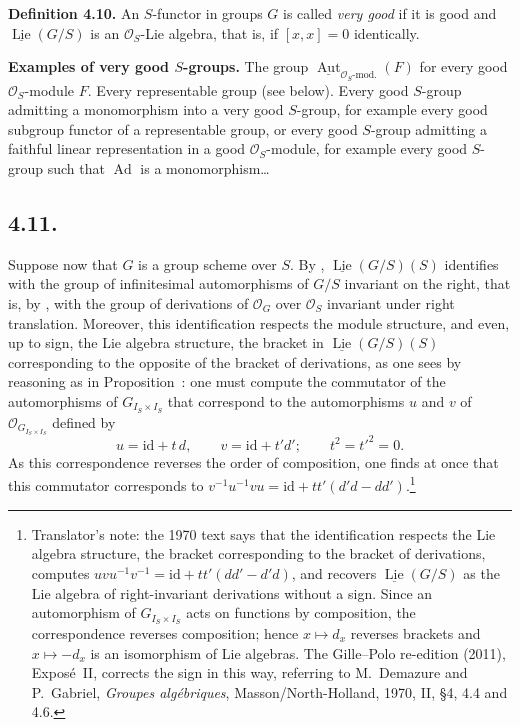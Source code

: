 \medskip
\noindent{}\textbf{Definition 4.10.}
An \(S\)-functor in groups \(G\) is called \emph{very good} if it is
good and \(\underline{\operatorname{Lie}}(G/S)\) is an
\(\mathcal O_S\)-Lie algebra, that is, if \([x,x]=0\) identically.

\medskip
\noindent{}\textbf{Examples of very good \(S\)-groups.}
The group \(\underline{\operatorname{Aut}}_{\mathcal O_S\text{-mod.}}(F)\)
for every good \(\mathcal O_S\)-module \(F\). Every representable group
(see below). Every good \(S\)-group admitting a monomorphism into a very
good \(S\)-group, for example every good subgroup functor of a
representable group, or every good \(S\)-group admitting a faithful
linear representation in a good \(\mathcal O_S\)-module, for example
every good \(S\)-group such that \(\operatorname{Ad}\) is a
monomorphism\dots

\subsection*{4.11.}
Suppose now that \(G\) is a group scheme over \(S\). By
, \(\underline{\operatorname{Lie}}(G/S)(S)\) identifies with the
group of infinitesimal automorphisms of \(G/S\) invariant on the right,
that is, by , with the group of derivations of
\(\mathcal O_G\) over \(\mathcal O_S\) invariant under right translation.
Moreover, this identification respects the module structure, and even, up
to sign, the Lie algebra structure, the bracket in
\(\underline{\operatorname{Lie}}(G/S)(S)\) corresponding to the opposite
of the bracket of derivations, as one sees by reasoning as in
Proposition~: one must compute the commutator of the
automorphisms of \(G_{I_S\times I_S}\) that correspond to the automorphisms
\(u\) and \(v\) of \(\mathcal O_{G_{I_S\times I_S}}\) defined by
\[
 u=\mathrm{id}+t\,d,\qquad v=\mathrm{id}+t'd';\qquad t^2=t'^2=0.
\]
As this correspondence reverses the order of composition, one finds at
once that this commutator corresponds to
\(v^{-1}u^{-1}vu=\mathrm{id}+tt'(d'd-dd')\).\footnote{Translator's note: the
1970 text says that the identification respects the Lie algebra structure,
the bracket corresponding to the bracket of derivations, computes
\(uvu^{-1}v^{-1}=\mathrm{id}+tt'(dd'-d'd)\), and recovers
\(\underline{\operatorname{Lie}}(G/S)\) as the Lie algebra of
right-invariant derivations without a sign. Since an automorphism of
\(G_{I_S\times I_S}\) acts on functions by composition, the correspondence
reverses composition; hence \(x\mapsto d_x\) reverses brackets and
\(x\mapsto-d_x\) is an isomorphism of Lie algebras. The Gille--Polo
re-edition (2011), Expos\'e~II, corrects the sign in this way, referring to
M.~Demazure and P.~Gabriel, \emph{Groupes alg\'ebriques}, Masson/North-Holland,
1970, II, \S4, 4.4 and 4.6.}

